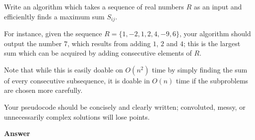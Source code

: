 \documentclass[12pt,twoside]{article}
\newcommand{\answer}{
 \par\medskip
 \textbf{Answer}
}
\newcommand{\answerIII}{ \answer

}
\begin{document}
\begin{problems}
Write an algorithm which takes a sequence of real numbers $R$ as an input and
efficienltly finds a maximum sum $S_{ij}$.

For instance, given the sequence $R = \{ 1, -2, 1, 2, 4, -9, 6 \}$, your algorithm
should output the number $7$, which results from adding $1$, $2$ and $4$; this is the
largest sum which can be acquired by adding consecutive elements of $R$.

Note that while this is easily doable on $O(n^2)$ time by simply finding the sum
of every consecutive subsequence, it is doable in $O(n)$ time if the subproblems
are chosen more carefully.

Your pseudocode should be concisely and clearly written; convoluted, messy, or
unnecessarily complex solutions will lose points.

\answerIII

\end{problems}
\end{document}
